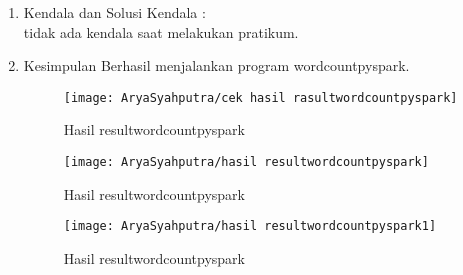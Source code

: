 \clearpage
{}
\begin{enumerate}
\item Kendala dan Solusi
\newline Kendala :\\
tidak ada kendala saat melakukan pratikum.

\item Kesimpulan
\newline Berhasil menjalankan program wordcountpyspark.


\begin{figure}[!ht]
\texttt{[image: AryaSyahputra/cek hasil rasultwordcountpyspark]}
\caption{Hasil resultwordcountpyspark}
\label{gam:resultwordcountpyspark}
\end{figure}

\begin{figure}[!ht]
\texttt{[image: AryaSyahputra/hasil resultwordcountpyspark]}
\caption{Hasil resultwordcountpyspark}
\label{gam:resultwordcountpyspark}
\end{figure}

\begin{figure}[!ht]
\texttt{[image: AryaSyahputra/hasil resultwordcountpyspark1]}
\caption{Hasil resultwordcountpyspark}
\label{gam:resultwordcountpyspark}
\end{figure}
\end{enumerate}
